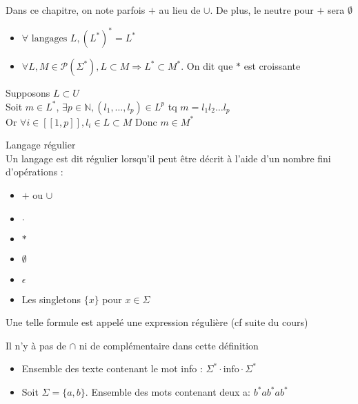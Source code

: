 \begin{rmq}
    Dans ce chapitre, on note parfois $+$ au lieu de $\cup$. De plus, le neutre pour $+$ sera $\emptyset$
\end{rmq}

\begin{prop}
    \begin{itemize}
        \item $\forall \text{ langages } L, (L^*)^*=L^*$
        \item $\forall L,M\in \mathcal{P}(\Sigma^*), L\subset M \Rightarrow L^*\subset M^*$. On dit que $*$ est croissante
    \end{itemize}
\end{prop}

\begin{dem}
    Supposons $L\subset U$\\
    Soit $m\in L^*$, $\exists p \in \mathbb{N}, (l_1,\dots,l_p)\in L^p$ tq
    $m=l_1l_2\dots l_p$\\

    Or $\forall i \in [[1,p]], l_i \in L \subset M$
    Donc $m \in M^*$
\end{dem}
    
\begin{defi} Langage régulier\\
    Un langage est dit régulier lorsqu'il peut être décrit à l'aide d'un nombre fini d'opérations :
    \begin{itemize}
        \item $+$ ou $\cup$
        \item $\cdot$
        \item $*$
        \item $\emptyset$
        \item $\epsilon$
        \item Les singletons $\{x\}$ pour $x \in \Sigma$ 
    \end{itemize}
\end{defi}

Une telle formule est appelé une expression régulière (cf suite du cours)\\

\begin{rmq}
    Il n'y à pas de $\cap$ ni de complémentaire dans cette définition
\end{rmq}

\begin{ex}
    \begin{itemize}
        \item Ensemble des texte contenant le mot info : $\Sigma^*\cdot \text{info}\cdot \Sigma^*$
        \item Soit $\Sigma = \{a,b\}$. Ensemble des mots contenant deux a: $b^*ab^*ab^*$
    \end{itemize}
\end{ex}

